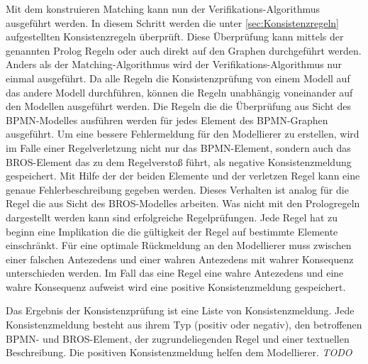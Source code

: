 Mit dem konstruieren Matching kann nun der Verifikations-Algorithmus ausgeführt werden.
In diesem Schritt werden die unter \cref{sec:Konsistenzregeln} aufgestellten Konsistenzregeln überprüft.
Diese Überprüfung kann mittels der genannten Prolog Regeln oder auch direkt auf den Graphen durchgeführt werden.
Anders als der Matching-Algorithmus wird der Verifikations-Algorithmus nur einmal ausgeführt.
Da alle Regeln die Konsistenzprüfung von einem Modell auf das andere Modell durchführen, können die Regeln unabhängig voneinander auf den Modellen ausgeführt werden.
Die Regeln die die Überprüfung aus Sicht des BPMN-Modelles ausführen werden für jedes Element des BPMN-Graphen ausgeführt.
Um eine bessere Fehlermeldung für den Modellierer zu erstellen, wird im Falle einer Regelverletzung nicht nur das BPMN-Element, sondern auch das BROS-Element das zu dem Regelverstoß führt, als negative Konsistenzmeldung gespeichert.
Mit Hilfe der der beiden Elemente und der verletzen Regel kann eine genaue Fehlerbeschreibung gegeben werden.
Dieses Verhalten ist analog für die Regel die aus Sicht des BROS-Modelles arbeiten.
Was nicht mit den Prologregeln dargestellt werden kann sind erfolgreiche Regelprüfungen.
Jede Regel hat zu beginn eine Implikation die die gültigkeit der Regel auf bestimmte Elemente einschränkt.
Für eine optimale Rückmeldung an den Modellierer muss zwischen einer falschen Antezedens und einer wahren Antezedens mit wahrer Konsequenz unterschieden werden.
Im Fall das eine Regel eine wahre Antezedens und eine wahre Konsequenz aufweist wird eine positive Konsistenzmeldung gespeichert.

Das Ergebnis der Konsistenzprüfung ist eine Liste von Konsistenzmeldung.
Jede Konsistenzmeldung besteht aus ihrem Typ (positiv oder negativ), den betroffenen BPMN- und BROS-Element, der zugrundeliegenden Regel und einer textuellen Beschreibung.
Die positiven Konsistenzmeldung helfen dem Modellierer. \textit{TODO}
